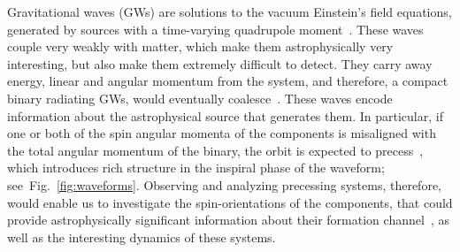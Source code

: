 Gravitational waves (GWs) are solutions to the vacuum Einstein's field
equations, generated by sources with a time-varying quadrupole
moment~\cite{Creighton}. These waves couple very weakly with matter, which
make them astrophysically very interesting, but also make them extremely
difficult to detect. They carry away energy, linear and angular momentum from
the system, and therefore, a compact binary radiating GWs, would eventually
coalesce~\cite{Peters1963}.
These waves encode information about the astrophysical source that
generates them. In particular, if one or both of the spin angular momenta of
the components is misaligned with the total angular momentum of the binary,
the orbit is expected to precess~\cite{Apostolatos1994}, which introduces rich
structure in the inspiral phase of the waveform; see~Fig.~\ref{fig:waveforms}.
Observing and analyzing precessing systems, therefore, would enable us to
investigate the spin-orientations of the components, that could provide
astrophysically significant information about their formation
channel~\cite{AstrophysicalImplications,Rodriguez}, as well as the interesting
dynamics of these systems.



